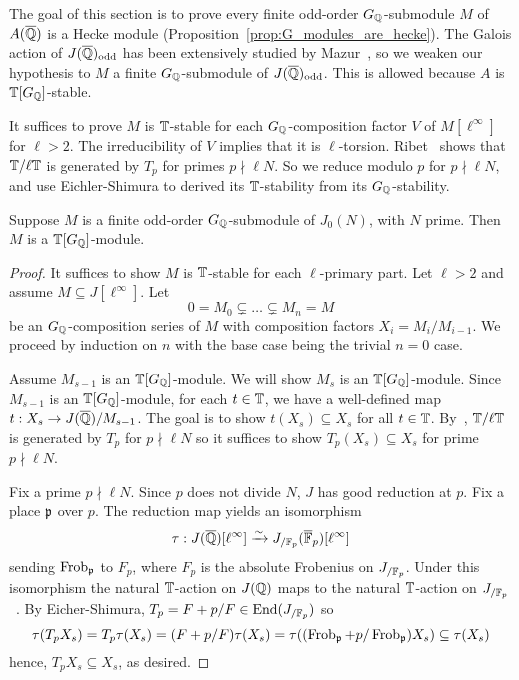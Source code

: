 \documentclass[thesis.tex]{subfiles}
\begin{document}
The goal of this section is to prove every finite odd-order $G_{\mathbb{Q}}$-submodule
$M$ of $A(\overline{\mathbb{Q}})$ is a Hecke module
(Proposition~\ref{prop:G_modules_are_hecke}). The Galois action of
$J(\overline{\mathbb{Q}})_{\mathrm{odd}}$ has been extensively studied by Mazur~\cite{mazur:eisenstein},
so we weaken our hypothesis to $M$ a finite $G_{\mathbb{Q}}$-submodule of
$J(\overline{\mathbb{Q}})_{\mathrm{odd}}$. This is allowed because $A$ is $\mathbb{T}[G_{\mathbb{Q}}]$-stable.

It suffices to prove $M$ is $\mathbb{T}$-stable for each $G_{\mathbb{Q}}$-composition factor $V$
of $M[\ell^\infty]$ for $\ell>2$. The irreducibility of $V$ implies that it is
$\ell$-torsion. Ribet~\cite[Proposition 6.1]{ribet:semistable_gal} shows that
$\mathbb{T}/\ell \mathbb{T}$ is generated by $T_p$ for primes $p\nmid \ell N$. So we reduce
modulo $p$ for $p\nmid \ell N$, and use Eichler-Shimura to derived its
$\mathbb{T}$-stability from its $G_{\mathbb{Q}}$-stability.

\begin{proposition}\label{prop:G_modules_are_hecke}
    Suppose $M$ is a finite odd-order $G_{\mathbb{Q}}$-submodule of $J_0(N)$, with $N$
    prime. Then $M$ is a $\mathbb{T}[G_{\mathbb{Q}}]$-module.
\end{proposition}
\begin{proof}
    It suffices to show $M$ is $\mathbb{T}$-stable for each $\ell$-primary part. Let
    $\ell>2$ and assume $M\subseteq J[\ell^\infty]$. Let
    \[
        0 = M_0 \subsetneq \ldots \subsetneq M_n = M
    \]
    be an $G_{\mathbb{Q}}$-composition series of $M$ with composition factors $X_i =
    M_i/M_{i-1}$. We proceed by induction on $n$ with the base
    case being the trivial $n=0$ case.

    Assume $M_{s-1}$ is an $\mathbb{T}[G_{\mathbb{Q}}]$-module. We will show $M_s$ is an
    $\mathbb{T}[G_{\mathbb{Q}}]$-module. Since $M_{s-1}$ is an $\mathbb{T}[G_{\mathbb{Q}}]$-module, for each
    $t\in \mathbb{T}$, we have a well-defined map $t:X_s\to J(\overline{\mathbb{Q}})/M_{s-1}$. The
    goal is to show $t(X_s)\subseteq X_s$ for all $t\in \mathbb{T}$.
    By~\cite[Proposition 2]{ribet:mult_p_finite}, $\mathbb{T}/\ell \mathbb{T}$ is generated
    by $T_p$ for $p\nmid \ell N$ so it suffices to show $T_p(X_s)\subseteq X_s$
    for prime $p\nmid \ell N$.

    Fix a prime $p\nmid \ell N$. Since $p$ does not divide $N$, $J$ has good
    reduction at $p$. Fix a place $\mathfrak{p}$ over $p$. The reduction map yields an
    isomorphism~\cite[Theorem 1, Lemma 2]{serre-tate}
    \[
        \tau:J(\overline{\mathbb{Q}})[\ell^\infty] \xrightarrow{\sim} J_{/\mathbb{F}_p} (\overline{\mathbb{F}}_p)[\ell^\infty]
    \]
    sending $\operatorname{Frob}_{\mathfrak{p}}$ to $F_p$, where $F_p$ is the absolute Frobenius on
    $J_{/\mathbb{F}_p}$. Under this isomorphism the natural $\mathbb{T}$-action on $J(\mathbb{Q})$
    maps to the natural $\mathbb{T}$-action on $J_{/\mathbb{F}_p}$~\cite[\S
    5.2]{ribet-stein:serre}. By Eicher-Shimura, $T_p = F+p/F\in
    \operatorname{End}(J_{/\mathbb{F}_p})$ so
    \[
        \tau(T_p X_s)
        = T_p\tau(X_s)
        = (F+p/F)\tau(X_s)
        = \tau((\operatorname{Frob}_{\mathfrak{p}}+p/\operatorname{Frob}_{\mathfrak{p}})X_s)
        \subseteq \tau(X_s)
    \]
    hence, $T_p X_s\subseteq X_s$, as desired.
\end{proof}
\end{document}
